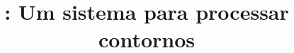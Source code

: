 \documentclass{article}
\title{\termo{Goiaba}: Um sistema para processar contornos}
\author{}
\begin{document}
\graphicspath{{figs/}{out/}{data/}{lily/}}

\maketitle

\begin{abstract}
  
\end{abstract}





\end{document}
